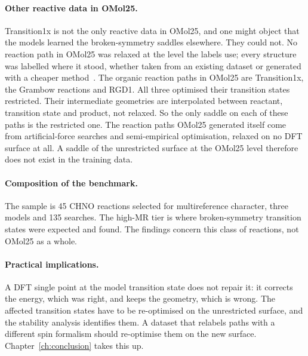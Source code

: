 \paragraph{Other reactive data in OMol25.} Transition1x is not the only
reactive data in OMol25, and one might object that the models learned
the broken-symmetry saddles elsewhere. They could not. No reaction
path in OMol25 was relaxed at the level the labels use; every
structure was labelled where it stood, whether taken from an existing
dataset or generated with a cheaper method~\cite{omol25}. The organic
reaction paths in OMol25 are Transition1x, the Grambow reactions and
RGD1. All three optimised their transition states restricted. Their
intermediate geometries are interpolated between reactant, transition
state and product, not relaxed. So the only saddle on each of these
paths is the restricted one. The reaction paths OMol25 generated
itself come from artificial-force searches and semi-empirical
optimisation, relaxed on no DFT surface at all. A saddle of the
unrestricted surface at the OMol25 level therefore does not exist in
the training data.

\paragraph{Composition of the benchmark.} The sample is 45 CHNO reactions
selected for multireference character, three models and 135 searches.
The high-MR tier is where broken-symmetry transition states were
expected and found. The findings concern this class of reactions, not
OMol25 as a whole.

\paragraph{Practical implications.} A DFT single point at the model transition state
does not repair it: it corrects the energy, which was right, and keeps
the geometry, which is wrong. The affected transition states have to
be re-optimised on the unrestricted surface, and the stability
analysis identifies them. A dataset that relabels paths with a
different spin formalism should re-optimise them on the new surface.
Chapter~\ref{ch:conclusion} takes this up.
